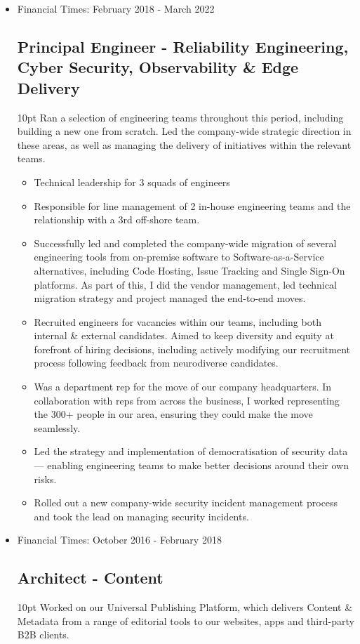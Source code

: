 \documentclass[a4paper]{article}
\newenvironment{detail}{\begin{adjustwidth}{10pt}{}}{\end{adjustwidth}}
\begin{document}
\begin{itemize}
\item Financial Times: February 2018 - March 2022
\subsection*{Principal Engineer - Reliability Engineering, Cyber Security, Observability \& Edge Delivery}
\begin{detail}
Ran a selection of engineering teams throughout this period, including building a new one from scratch.  Led the company-wide strategic direction in these areas, as well as managing the delivery of initiatives within the relevant teams.

\begin{itemize}
	\item Technical leadership for 3 squads of engineers
	\item Responsible for line management of 2 in-house engineering teams and the relationship with a 3rd off-shore team.
	\item Successfully led and completed the company-wide migration of several engineering tools from on-premise software to Software-as-a-Service alternatives, including Code Hosting, Issue Tracking and Single Sign-On platforms.  As part of this, I did the vendor management, led technical migration strategy and project managed the end-to-end moves.
	\item Recruited engineers for vacancies within our teams, including both internal \& external candidates.  Aimed to keep diversity and equity at forefront of hiring decisions, including actively modifying our recruitment process following feedback from neurodiverse candidates.
	\item Was a department rep for the move of our company headquarters.  In collaboration with reps from across the business, I worked representing the 300+ people in our area, ensuring they could make the move seamlessly.
	\item Led the strategy and implementation of democratisation of security data — enabling engineering teams to make better decisions around their own risks.
	\item Rolled out a new company-wide security incident management process and took the lead on managing security incidents.
\end{itemize}
\end{detail}

\item Financial Times: October 2016 - February 2018
\subsection*{Architect - Content}
\begin{detail}
Worked on our Universal Publishing Platform, which delivers Content \& Metadata from a range of editorial tools to our websites, apps and third-party B2B clients.


\end{detail}
\end{itemize}
\end{document}
